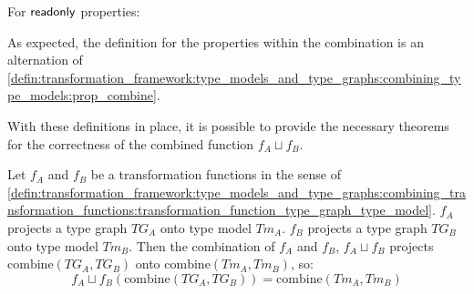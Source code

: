 \begin{defin}
For $\mathsf{readonly}$ properties:
\end{defin}

As expected, the definition for the properties within the combination is an alternation of \cref{defin:transformation_framework:type_models_and_type_graphs:combining_type_models:prop_combine}.

With these definitions in place, it is possible to provide the necessary theorems for the correctness of the combined function $f_{A} \sqcup f_{B}$.

\begin{thm}
\label{defin:transformation_framework:type_models_and_type_graphs:combining_transformation_functions:tmod_combine_mapping_correct}
Let $f_A$ and $f_B$ be a transformation functions in the sense of \cref{defin:transformation_framework:type_models_and_type_graphs:combining_transformation_functions:transformation_function_type_graph_type_model}. $f_A$ projects a type graph $TG_A$ onto type model $Tm_A$. $f_B$ projects a type graph $TG_B$ onto type model $Tm_B$. Then the combination of $f_A$ and $f_B$, $f_{A} \sqcup f_{B}$ projects $\mathrm{combine}(TG_A, TG_B)$ onto $\mathrm{combine}(Tm_A, Tm_B)$, so:
\begin{equation*}
    f_{A} \sqcup f_{B}(\mathrm{combine}(TG_A, TG_B)) = \mathrm{combine}(Tm_A, Tm_B)
\end{equation*}
\end{thm}

